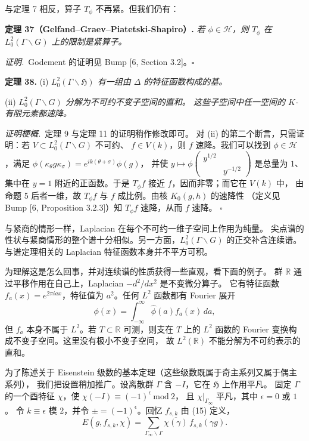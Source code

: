 与定理 7 相反，算子 $T_{\phi}$ 不再紧。但我们仍有：

\par\medskip\noindent\textbf{定理 37（Gelfand--Graev--Piatetski-Shapiro）.}\quad
\emph{若 $\phi\in\mathcal{H}$，则 $T_{\phi}$ 在 $L_{0}^{2}(\Gamma\backslash G)$ 上的限制是紧算子。}

\smallskip
\noindent\emph{证明.}\ Godement 的证明见 Bump [6, Section 3.2]。\hfill$\square$

\par\medskip\noindent\textbf{定理 38.}\quad
(i) \emph{$L_{0}^{2}(\Gamma\backslash\mathfrak{H})$ 有一组由 $\Delta$ 的特征函数构成的基。}

(ii) \emph{$L_{0}^{2}(\Gamma\backslash G)$ 分解为不可约不变子空间的直和。
这些子空间中任一空间的 $K$-有限元素都速降。}

\smallskip
\noindent\emph{证明梗概.}\ 定理 9 与定理 11 的证明稍作修改即可。
对 (ii) 的第二个断言，只需证明：若 $V\subset L_{0}^{2}(\Gamma\backslash G)$ 不可约、
$f\in V(k)$，则 $f$ 速降。我们可以找到 $\phi\in\mathcal{H}$，满足
$\phi(\kappa_{\theta}g\kappa_{\sigma})=e^{ik(\theta+\sigma)}\phi(g)$，
并使 $y\mapsto\phi\begin{pmatrix}y^{1/2}&\\&y^{-1/2}\end{pmatrix}$ 是总量为 $1$、
集中在 $y=1$ 附近的正函数。于是 $T_{\phi}f$ 接近 $f$，因而非零；而它在 $V(k)$ 中，
由命题 5 后者一维，故 $T_{\phi}f$ 与 $f$ 成比例。由核 $K_{0}(g,h)$ 的速降性
（定义见 Bump [6, Proposition 3.2.3]）知 $T_{\phi}f$ 速降，从而 $f$ 速降。
\hfill$\square$

与紧商的情形一样，Laplacian 在每个不可约一维子空间上作用为纯量。
尖点谱的性状与紧商情形的整个谱十分相似。另一方面，$L_{0}^{2}(\Gamma\backslash G)$
的正交补含连续谱。与谱定理相关的 Laplacian 特征函数本身并不平方可积。

为理解这是怎么回事，并对连续谱的性质获得一些直观，看下面的例子。
群 $\mathbb{R}$ 通过平移作用在自己上，Laplacian $-d^{2}/dx^{2}$ 是不变微分算子。
它有特征函数 $f_{a}(x)=e^{2\pi iax}$，特征值为 $a^{2}$。任何 $L^{2}$ 函数都有 Fourier 展开
\[
\phi(x)=\int_{-\infty}^{\infty}\hat\phi(a)f_{a}(x)\,da,
\]
但 $f_{a}$ 本身不属于 $L^{2}$。若 $T\subset\mathbb{R}$ 可测，则支在 $T$ 上的 $L^{2}$ 函数的
Fourier 变换构成不变子空间。这里没有极小不变子空间，
故 $L^{2}(\mathbb{R})$ 不能分解为不可约表示的直和。

为了陈述关于 Eisenstein 级数的基本定理（这些级数既属于奇主系列又属于偶主系列），
我们把设置稍加推广。设离散群 $\Gamma$ 含 $-I$，它在 $\mathfrak{H}$ 上作用平凡。
固定 $\Gamma$ 的一个酉特征 $\chi$，使 $\chi(-I)\equiv(-1)^{\epsilon}\ \mathrm{mod}\ 2$，
且 $\chi|_{\Gamma_{\infty}}$ 平凡，其中 $\epsilon=0$ 或 $1$。
令 $k\equiv\epsilon$ 模 $2$，并令 $\pm=(-1)^{\epsilon}$。回忆 $f_{s,k}$ 由 (15) 定义，
\begin{equation}\tag{41}
E(g,f_{s,k},\chi)=\sum_{\Gamma_{\infty}\backslash\Gamma}
\overline{\chi(\gamma)}\,f_{s,k}(\gamma g).
\end{equation}

